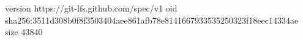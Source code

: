 version https://git-lfs.github.com/spec/v1
oid sha256:3511d308b0f8f3503404aee861afb78e8141667933535250323f18eec14334ae
size 43840
